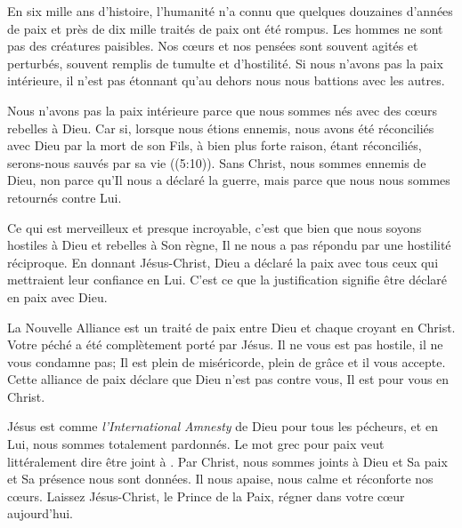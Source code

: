 

En six mille ans d'histoire, l'humanité n'a connu que quelques douzaines d'années de paix et près de dix mille traités de paix ont été rompus. Les hommes ne sont pas des créatures paisibles. Nos cœurs et nos pensées sont souvent agités et perturbés, souvent remplis de tumulte et d'hostilité. Si nous n'avons pas la paix intérieure, il n'est pas étonnant qu'au dehors nous nous battions avec les autres.

Nous n'avons pas la paix intérieure parce que nous sommes nés avec des cœurs rebelles à Dieu.
 \og Car si, lorsque nous étions ennemis, nous avons été réconciliés avec Dieu par la mort de son Fils, à bien plus forte raison, étant réconciliés, serons-nous sauvés par sa vie \fg{} ((5:10)). Sans Christ, nous sommes ennemis de Dieu, non parce qu'Il nous a déclaré la guerre, mais parce que nous nous sommes retournés contre Lui.

Ce qui est merveilleux et presque incroyable, c'est que bien que nous soyons hostiles à Dieu et rebelles à Son règne, Il ne nous a pas répondu par une hostilité réciproque. En donnant Jésus-Christ, Dieu a déclaré la paix avec tous ceux qui mettraient leur confiance en Lui. C'est ce que la justification signifie \ocadr être déclaré en paix avec Dieu.

La Nouvelle Alliance est un traité de paix entre Dieu et chaque croyant en Christ. Votre péché a été complètement porté par Jésus. Il ne vous est pas hostile, il ne vous condamne pas; Il est plein de miséricorde, plein de grâce et il vous accepte. Cette alliance de paix déclare que Dieu n'est pas contre vous, Il est pour vous en Christ.

Jésus est comme \emph{l'International Amnesty} de Dieu pour tous les pécheurs, et en Lui, nous sommes totalement pardonnés. Le mot grec pour \og paix \fg{} veut littéralement dire \og être joint à \fg{}. Par Christ, nous sommes joints à Dieu et Sa paix et Sa présence nous sont données. Il nous apaise, nous calme et réconforte nos cœurs. Laissez Jésus-Christ, le Prince de la Paix, régner dans votre cœur aujourd'hui.



